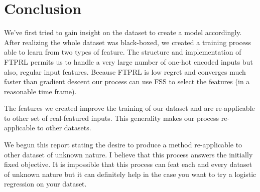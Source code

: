 \section{Conclusion}
\label{sec:conclusion}

	We've first tried to gain insight on the dataset to create a model accordingly. After realizing the whole dataset was black-boxed, we created a training process able to learn from two types of feature. The structure and implementation of FTPRL permits us to handle a very large number of one-hot encoded inputs but also, regular input features. Because FTPRL is low regret and converges much faster than gradient descent our process can use FSS to select the features (in a reasonable time frame). 

	The features we created improve the training of our dataset and are re-applicable to other set of real-featured inputs. This generality makes our process re-applicable to other datasets.

	We begun this report stating the desire to produce a method re-applicable to other dataset of unknown nature. I believe that this process answers the initially fixed objective. It is impossible that this process can feat each and every dataset of unknown nature but it can definitely help in the case you want to try a logistic regression on your dataset.